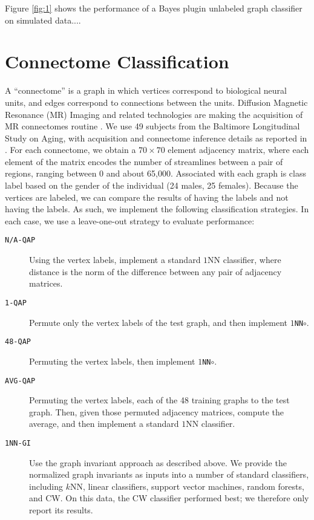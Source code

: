 \documentclass[10pt,journal,cspaper,compsoc]{IEEEtran}
\begin{document}
Figure \ref{fig:1} shows the performance of a Bayes plugin unlabeled graph classifier on simulated data....








\section{Connectome Classification} %
\label{sub:connectome_classification}

A ``connectome'' is a graph in which vertices correspond to biological neural units, and edges correspond to connections between the units.  Diffusion Magnetic Resonance (MR) Imaging and related technologies are making the acquisition of MR connectomes routine \cite{Hagmann2010}.  We use 49 subjects from the Baltimore Longitudinal Study on Aging, with acquisition and connectome inference details as reported in \cite{OHBM10}.  For each connectome, we obtain a $70 \times 70$ element adjacency matrix, where each element of the matrix encodes the number of streamlines between a pair of regions, ranging between 0 and about 65,000.  Associated with each graph is class label based on the gender of the individual (24 males, 25 females).  Because the vertices are labeled, we can compare the results of having the labels and not having the labels.  As such, we implement the following classification strategies.  In each case, we use a leave-one-out strategy to evaluate performance:

\begin{description}
	\item[\texttt{N/A-QAP}] Using the vertex labels, implement a standard $1$NN classifier, where distance is the norm of the difference between any pair of adjacency matrices.
	\item[\texttt{1-QAP}] Permute only the vertex labels of the test graph, and then implement \texttt{$1$NN$\circ$\qapa}.
	\item[\texttt{48-QAP}] Permuting the vertex labels, then implement \texttt{$1$NN$\circ$\qapa}.
	\item[\texttt{AVG-QAP}] Permuting the vertex labels, \qapa each of the 48 training graphs to the test graph.  Then, given those permuted adjacency matrices, compute the average, and then implement a standard $1$NN classifier.
	\item[\texttt{1NN-GI}] Use the graph invariant approach as described above. We provide the normalized graph invariants as inputs into a number of standard classifiers, including $k$NN, linear classifiers, support vector machines, random forests, and CW. On this data, the CW classifier performed best; we therefore only report its results.
\end{description}
\end{document}
